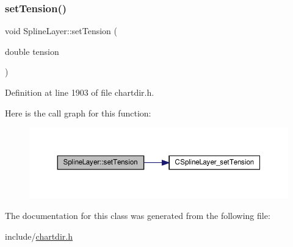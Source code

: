 \subsubsection{\texorpdfstring{set\+Tension()}{setTension()}}
{\footnotesize\ttfamily void Spline\+Layer\+::set\+Tension (\begin{DoxyParamCaption}\item[{double}]{tension }\end{DoxyParamCaption})\hspace{0.3cm}{\ttfamily [inline]}}



Definition at line 1903 of file chartdir.\+h.

Here is the call graph for this function\+:
\nopagebreak
\begin{figure}[H]
\begin{center}
\leavevmode
\includegraphics[width=350pt]{class_spline_layer_a1bea981af7bfba2930af1a0ee543b348_cgraph}
\end{center}
\end{figure}


The documentation for this class was generated from the following file\+:\begin{DoxyCompactItemize}
\item 
include/\hyperlink{chartdir_8h}{chartdir.\+h}\end{DoxyCompactItemize}

